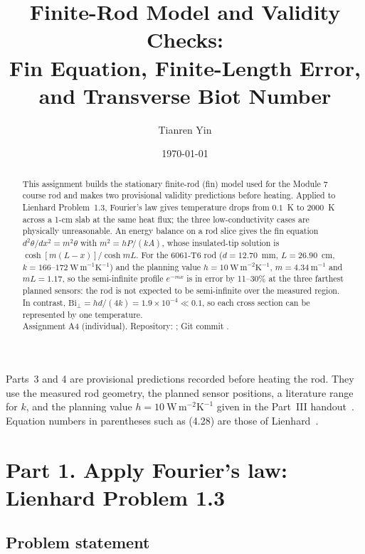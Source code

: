 \documentclass[reprint, amsmath, amssymb, aps, prl]{revtex4-2}
\newcommand{\Biperp}{\mathrm{Bi}_\perp}
\newcommand{\WmK}{\mathrm{W\,m^{-1}K^{-1}}}
\newcommand{\WmmK}{\mathrm{W\,m^{-2}K^{-1}}}
\begin{document}

\title{Finite-Rod Model and Validity Checks:\\ Fin Equation, Finite-Length Error, and Transverse Biot Number}

\author{Tianren Yin}

\date{\today}

\begin{abstract}
This assignment builds the stationary finite-rod (fin) model used for the Module 7
course rod and makes two provisional validity predictions before heating. Applied to
Lienhard Problem~1.3, Fourier's law gives temperature drops from $0.1$~K to $2000$~K
across a 1-cm slab at the same heat flux; the three low-conductivity cases are physically
unreasonable. An energy balance on a rod slice gives the fin equation
$d^2\theta/dx^2=m^2\theta$ with $m^2=hP/(kA)$, whose insulated-tip solution is
$\cosh[m(L-x)]/\cosh mL$. For the 6061-T6 rod ($d=12.70$~mm, $L=26.90$~cm,
$k=166$--$172~\WmK$) and the planning value $h=10~\WmmK$, $m=4.34~\mathrm{m^{-1}}$ and
$mL=1.17$, so the semi-infinite profile $e^{-mx}$ is in error by 11--30\% at the three
farthest planned sensors: the rod is not expected to be semi-infinite over the measured
region. In contrast, $\Biperp=hd/(4k)=1.9\times10^{-4}\ll0.1$, so each cross section can
be represented by one temperature.
\\[4pt]
Assignment A4 (individual). Repository: \repourl; Git commit \texttt{\commit}.
\end{abstract}

\maketitle

Parts~3 and 4 are provisional predictions recorded before heating the rod. They use the
measured rod geometry, the planned sensor positions, a literature range for $k$, and the
planning value $h=10~\WmmK$ given in the Part~III handout~\cite{handout}. Equation numbers
in parentheses such as (4.28) are those of Lienhard~\cite{Lienhard}.

\section*{Part 1. Apply Fourier's law: Lienhard Problem 1.3}

\subsection*{Problem statement}
\end{document}
